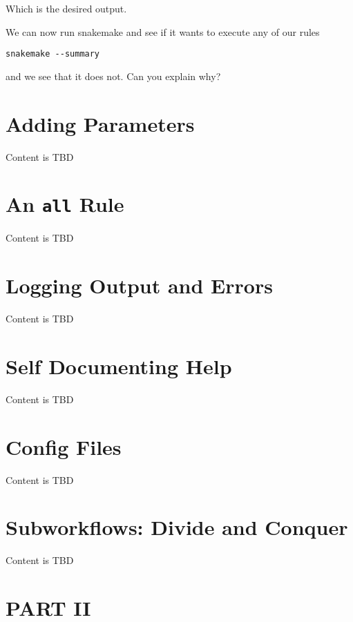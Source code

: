 \documentclass[]{book}
\theoremstyle{definition}
\theoremstyle{definition}
\theoremstyle{definition}
\theoremstyle{remark}
\begin{document}
Which is the desired output.

We can now run snakemake and see if it wants to execute any of our rules

\begin{verbatim}
snakemake --summary
\end{verbatim}

and we see that it does not. Can you explain why?

\chapter{Adding Parameters}\label{adding-parameters}

Content is TBD

\chapter{\texorpdfstring{An \texttt{all}
Rule}{An all Rule}}\label{an-all-rule}

Content is TBD

\chapter{Logging Output and Errors}\label{logging-output-and-errors}

Content is TBD

\chapter{Self Documenting Help}\label{self-documenting-help}

Content is TBD

\chapter{Config Files}\label{config-files}

Content is TBD

\chapter{Subworkflows: Divide and
Conquer}\label{subworkflows-divide-and-conquer}

Content is TBD

\chapter*{PART II}\label{part-ii}
\end{document}
